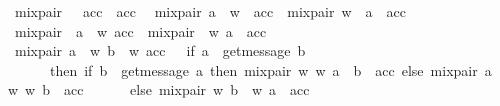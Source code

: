 \begin{isabellebody}
\ {\isachardoublequoteopen}mix{\isacharunderscore}{\kern0pt}pair\ {\isacharbrackleft}{\kern0pt}{\isacharbrackright}{\kern0pt}\ {\isacharbrackleft}{\kern0pt}{\isacharbrackright}{\kern0pt}\ acc\ {\isacharequal}{\kern0pt}\ acc{\isachardoublequoteclose}\ {\isacharbar}{\kern0pt}\isanewline
\ {\isachardoublequoteopen}mix{\isacharunderscore}{\kern0pt}pair\ {\isacharparenleft}{\kern0pt}a\ {\isacharhash}{\kern0pt}\ w{\isacharprime}{\kern0pt}{\isacharparenright}{\kern0pt}\ {\isacharbrackleft}{\kern0pt}{\isacharbrackright}{\kern0pt}\ acc\ {\isacharequal}{\kern0pt}\ mix{\isacharunderscore}{\kern0pt}pair\ w{\isacharprime}{\kern0pt}\ {\isacharbrackleft}{\kern0pt}{\isacharbrackright}{\kern0pt}\ {\isacharparenleft}{\kern0pt}a\ {\isacharhash}{\kern0pt}\ acc{\isacharparenright}{\kern0pt}{\isachardoublequoteclose}\ {\isacharbar}{\kern0pt}\isanewline
\ {\isachardoublequoteopen}mix{\isacharunderscore}{\kern0pt}pair\ {\isacharbrackleft}{\kern0pt}{\isacharbrackright}{\kern0pt}\ {\isacharparenleft}{\kern0pt}a\ {\isacharhash}{\kern0pt}\ w{\isacharparenright}{\kern0pt}\ acc\ {\isacharequal}{\kern0pt}\ mix{\isacharunderscore}{\kern0pt}pair\ {\isacharbrackleft}{\kern0pt}{\isacharbrackright}{\kern0pt}\ w\ {\isacharparenleft}{\kern0pt}a\ {\isacharhash}{\kern0pt}\ acc{\isacharparenright}{\kern0pt}{\isachardoublequoteclose}\ {\isacharbar}{\kern0pt}\isanewline
\ {\isachardoublequoteopen}mix{\isacharunderscore}{\kern0pt}pair\ {\isacharparenleft}{\kern0pt}a\ {\isacharhash}{\kern0pt}\ w{\isacharprime}{\kern0pt}{\isacharparenright}{\kern0pt}\ {\isacharparenleft}{\kern0pt}b\ {\isacharhash}{\kern0pt}\ w{\isacharparenright}{\kern0pt}\ acc\ \ {\isacharequal}{\kern0pt}\ {\isacharparenleft}{\kern0pt}if\ a\ {\isacharequal}{\kern0pt}\ {\isacharbang}{\kern0pt}{\isasymlangle}get{\isacharunderscore}{\kern0pt}message\ b{\isasymrangle}\isanewline
\ \ \ \ \ \ then\ {\isacharparenleft}{\kern0pt}if\ b\ {\isacharequal}{\kern0pt}\ {\isacharquery}{\kern0pt}{\isasymlangle}get{\isacharunderscore}{\kern0pt}message\ a{\isasymrangle}\ then\ mix{\isacharunderscore}{\kern0pt}pair\ w{\isacharprime}{\kern0pt}\ w\ {\isacharparenleft}{\kern0pt}a\ {\isacharhash}{\kern0pt}\ b\ {\isacharhash}{\kern0pt}\ acc{\isacharparenright}{\kern0pt}\ else\ mix{\isacharunderscore}{\kern0pt}pair\ {\isacharparenleft}{\kern0pt}a\ {\isacharhash}{\kern0pt}\ w{\isacharprime}{\kern0pt}{\isacharparenright}{\kern0pt}\ w\ {\isacharparenleft}{\kern0pt}b\ {\isacharhash}{\kern0pt}\ acc{\isacharparenright}{\kern0pt}{\isacharparenright}{\kern0pt}\isanewline
\ \ \ \ \ \ else\ mix{\isacharunderscore}{\kern0pt}pair\ w{\isacharprime}{\kern0pt}\ {\isacharparenleft}{\kern0pt}b\ {\isacharhash}{\kern0pt}\ w{\isacharparenright}{\kern0pt}\ {\isacharparenleft}{\kern0pt}a\ {\isacharhash}{\kern0pt}\ acc{\isacharparenright}{\kern0pt}{\isacharparenright}{\kern0pt}{\isachardoublequoteclose}%

\end{isabellebody}
